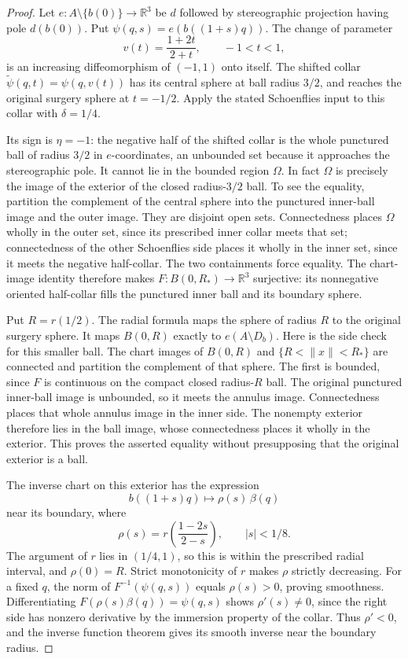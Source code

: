 \begin{proof}
Let $e:A\setminus\{b(0)\}\to\mathbb R^3$ be $d$ followed by
stereographic projection having pole $d(b(0))$.  Put
$\psi(q,s)=e(b((1+s)q))$.  The change of parameter
\[
 v(t)=\frac{1+2t}{2+t},\qquad -1<t<1,
\]
is an increasing diffeomorphism of $(-1,1)$ onto itself.
The shifted collar $\widetilde\psi(q,t)=\psi(q,v(t))$ has its
central sphere at ball radius $3/2$, and reaches the original surgery
sphere at $t=-1/2$.  Apply the stated Schoenflies input to this collar
with $\delta=1/4$.

Its sign is $\eta=-1$: the negative half of the shifted collar is the
whole punctured ball of radius $3/2$ in $e$-coordinates, an unbounded
set because it approaches the stereographic pole.  It cannot lie in
the bounded region $\Omega$.  In fact $\Omega$ is precisely the image
of the exterior of the closed radius-$3/2$ ball.  To see the equality,
partition the complement of the central sphere into the punctured
inner-ball image and the outer image.  They are disjoint open sets.
Connectedness places $\Omega$ wholly in the outer set, since its
prescribed inner collar meets that set; connectedness of the other
Schoenflies side places it wholly in the inner set, since it meets
the negative half-collar.  The two containments force equality.
The chart-image identity therefore makes $F:B(0,R_*)\to\mathbb R^3$
surjective: its nonnegative oriented half-collar fills the punctured
inner ball and its boundary sphere.

Put $R=r(1/2)$.  The radial formula maps the sphere of radius $R$ to
the original surgery sphere.  It maps $B(0,R)$ exactly to
$e(A\setminus D_b)$.  Here is the side check for this smaller ball.
The chart images of $B(0,R)$ and $\{R<\|x\|<R_*\}$ are connected
and partition the complement of that sphere.  The first is bounded,
since $F$ is continuous on the compact closed radius-$R$ ball.
The original punctured inner-ball image is unbounded, so it meets
the annulus image.  Connectedness places that whole annulus image
in the inner side.  The nonempty exterior therefore lies in the
ball image, whose connectedness places it wholly in the exterior.
This proves the asserted equality without presupposing that the
original exterior is a ball.

The inverse chart on this exterior has the expression
\[
       b((1+s)q)\longmapsto \rho(s)\,\beta(q)
\]
near its boundary, where
\[
 \rho(s)=r\left(\frac{1-2s}{2-s}\right),\qquad |s|<1/8.
\]
The argument of $r$ lies in $(1/4,1)$, so this is within the prescribed
radial interval, and $\rho(0)=R$.  Strict monotonicity of $r$ makes
$\rho$ strictly decreasing.  For a fixed $q$, the norm of
$F^{-1}(\psi(q,s))$ equals $\rho(s)>0$, proving smoothness.
Differentiating
$F(\rho(s)\beta(q))=\psi(q,s)$ shows $\rho'(s)\ne0$, since the
right side has nonzero derivative by the immersion property of the
collar.  Thus $\rho'<0$, and the inverse function theorem gives its
smooth inverse near the boundary radius.


\end{proof}
